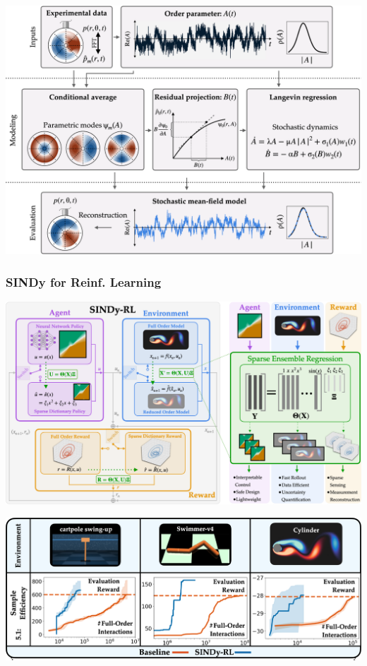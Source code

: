 \documentclass[aspectratio=169,compress,12pt,dvipsnames]{beamer}
\begin{document}
\begin{frame}
    \vfill
    \centering
    \includegraphics[height=.9\textheight]{imgs/langevin_regression_five.png}
    \vfill
\end{frame}

\begin{frame}
    \frametitle{SINDy for Reinf. Learning}
    \vfill
    \centering
    \includegraphics[width=.8\textwidth]{imgs/sindy_rl_one.png}
    \vfill
\end{frame}

\begin{frame}
    \vfill
    \centering
    \includegraphics[width=\textwidth]{imgs/sindy_rl_two.png}
    \vfill
\end{frame}
\end{document}
